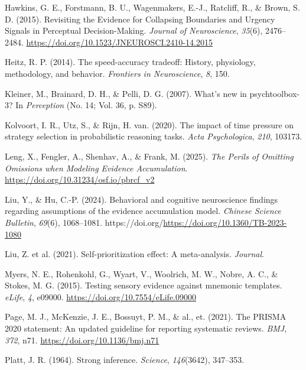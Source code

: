\documentclass[
  english,
  man,floatsintext]{apa6}
\newlength{\cslhangindent}
\newenvironment{CSLReferences}[2] %
 {\begin{list}{}{%
  \setlength{\itemindent}{0pt}
  \setlength{\leftmargin}{0pt}
  \setlength{\parsep}{0pt}
  \ifodd #1
   \setlength{\leftmargin}{\cslhangindent}
   \setlength{\itemindent}{-1\cslhangindent}
  \fi
  \setlength{\itemsep}{#2\baselineskip}}}
 {\end{list}}
\begin{document}
\begin{CSLReferences}{1}{0}
Hawkins, G. E., Forstmann, B. U., Wagenmakers, E.-J., Ratcliff, R., \& Brown, S. D. (2015). Revisiting the {Evidence} for {Collapsing} {Boundaries} and {Urgency} {Signals} in {Perceptual} {Decision}-{Making}. \emph{Journal of Neuroscience}, \emph{35}(6), 2476--2484. \url{https://doi.org/10.1523/JNEUROSCI.2410-14.2015}

Heitz, R. P. (2014). The speed-accuracy tradeoff: History, physiology, methodology, and behavior. \emph{Frontiers in Neuroscience}, \emph{8}, 150.

Kleiner, M., Brainard, D. H., \& Pelli, D. G. (2007). What's new in psychtoolbox-3? In \emph{Perception} (No. 14; Vol. 36, p. S89).

Kolvoort, I. R., Utz, S., \& Rijn, H. van. (2020). The impact of time pressure on strategy selection in probabilistic reasoning tasks. \emph{Acta Psychologica}, \emph{210}, 103173.

Leng, X., Fengler, A., Shenhav, A., \& Frank, M. (2025). \emph{The {Perils} of {Omitting} {Omissions} when {Modeling} {Evidence} {Accumulation}}. \url{https://doi.org/10.31234/osf.io/pbrcf_v2}

Liu, Y., \& Hu, C.-P. (2024). Behavioral and cognitive neuroscience findings regarding assumptions of the evidence accumulation model. \emph{Chinese Science Bulletin}, \emph{69}(6), 1068--1081. https://doi.org/\url{https://doi.org/10.1360/TB-2023-1080}

Liu, Z. et al. (2021). Self-prioritization effect: A meta-analysis. \emph{Journal}.

Myers, N. E., Rohenkohl, G., Wyart, V., Woolrich, M. W., Nobre, A. C., \& Stokes, M. G. (2015). Testing sensory evidence against mnemonic templates. \emph{{eLife}}, \emph{4}, e09000. \url{https://doi.org/10.7554/eLife.09000}

Page, M. J., McKenzie, J. E., Bossuyt, P. M., \& al., et. (2021). The PRISMA 2020 statement: An updated guideline for reporting systematic reviews. \emph{BMJ}, \emph{372}, n71. \url{https://doi.org/10.1136/bmj.n71}

Platt, J. R. (1964). Strong inference. \emph{Science}, \emph{146}(3642), 347--353.


\end{CSLReferences}
\end{document}
